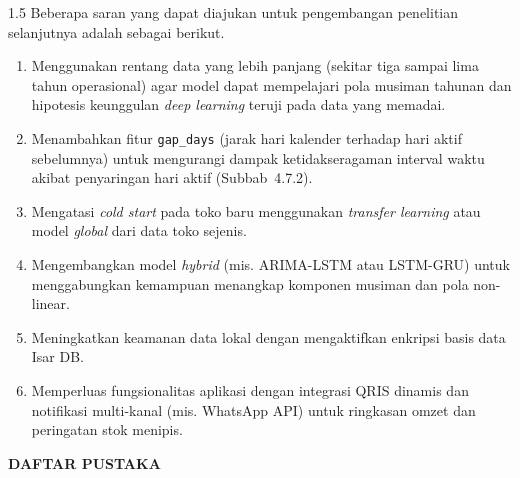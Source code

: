 \documentclass[12pt, a4paper, onecolumn, oneside]{report}
\begin{document}
\begin{spacing}{1.5}
Beberapa saran yang dapat diajukan untuk pengembangan penelitian selanjutnya adalah sebagai berikut.
\begin{enumerate}
    \item Menggunakan rentang data yang lebih panjang (sekitar tiga sampai lima tahun operasional) agar model dapat mempelajari pola musiman tahunan dan hipotesis keunggulan \textit{deep learning} teruji pada data yang memadai.
    \item Menambahkan fitur \texttt{gap\_days} (jarak hari kalender terhadap hari aktif sebelumnya) untuk mengurangi dampak ketidakseragaman interval waktu akibat penyaringan hari aktif (Subbab~4.7.2).
    \item Mengatasi \textit{cold start} pada toko baru menggunakan \textit{transfer learning} atau model \textit{global} dari data toko sejenis.
    \item Mengembangkan model \textit{hybrid} (mis. ARIMA-LSTM atau LSTM-GRU) untuk menggabungkan kemampuan menangkap komponen musiman dan pola non-linear.
    \item Meningkatkan keamanan data lokal dengan mengaktifkan enkripsi basis data Isar DB.
    \item Memperluas fungsionalitas aplikasi dengan integrasi QRIS dinamis dan notifikasi multi-kanal (mis. WhatsApp API) untuk ringkasan omzet dan peringatan stok menipis.
\end{enumerate}

\end{spacing}

\newpage
{}
{}
\begin{center}
{\large\bfseries DAFTAR PUSTAKA}
\end{center}
\end{document}
